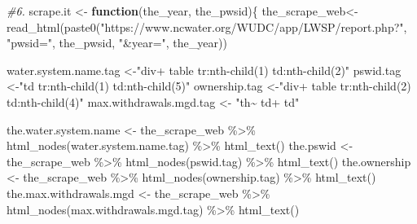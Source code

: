 \documentclass[
]{article}
\newenvironment{Shaded}{\begin{snugshade}}{\end{snugshade}}
\newcommand{\CommentTok}[1]{\textcolor[rgb]{0.56,0.35,0.01}{\textit{#1}}}
\newcommand{\ControlFlowTok}[1]{\textcolor[rgb]{0.13,0.29,0.53}{\textbf{#1}}}
\newcommand{\FunctionTok}[1]{\textcolor[rgb]{0.00,0.00,0.00}{#1}}
\newcommand{\NormalTok}[1]{#1}
\newcommand{\OtherTok}[1]{\textcolor[rgb]{0.56,0.35,0.01}{#1}}
\newcommand{\SpecialCharTok}[1]{\textcolor[rgb]{0.00,0.00,0.00}{#1}}
\newcommand{\StringTok}[1]{\textcolor[rgb]{0.31,0.60,0.02}{#1}}
\begin{document}
\begin{Shaded}
\begin{Highlighting}[]
\CommentTok{\#6.}
\NormalTok{scrape.it }\OtherTok{\textless{}{-}} \ControlFlowTok{function}\NormalTok{(the\_year, the\_pwsid)\{}
\NormalTok{  the\_scrape\_web}\OtherTok{\textless{}{-}}\FunctionTok{read\_html}\NormalTok{(}\FunctionTok{paste0}\NormalTok{(}\StringTok{"https://www.ncwater.org/WUDC/app/LWSP/report.php?"}\NormalTok{, }\StringTok{"pwsid="}\NormalTok{, the\_pwsid, }\StringTok{"\&year="}\NormalTok{, the\_year))}

\NormalTok{  water.system.name.tag }\OtherTok{\textless{}{-}}\StringTok{"div+ table tr:nth{-}child(1) td:nth{-}child(2)"}
\NormalTok{  pswid.tag }\OtherTok{\textless{}{-}}\StringTok{"td tr:nth{-}child(1) td:nth{-}child(5)"}
\NormalTok{  ownership.tag }\OtherTok{\textless{}{-}}\StringTok{"div+ table tr:nth{-}child(2) td:nth{-}child(4)"}
\NormalTok{  max.withdrawals.mgd.tag }\OtherTok{\textless{}{-}}  \StringTok{"th\textasciitilde{} td+ td"}

\NormalTok{  the.water.system.name }\OtherTok{\textless{}{-}}\NormalTok{ the\_scrape\_web }\SpecialCharTok{\%\textgreater{}\%} \FunctionTok{html\_nodes}\NormalTok{(water.system.name.tag) }\SpecialCharTok{\%\textgreater{}\%} \FunctionTok{html\_text}\NormalTok{()}
\NormalTok{  the.pswid }\OtherTok{\textless{}{-}}\NormalTok{ the\_scrape\_web }\SpecialCharTok{\%\textgreater{}\%}   \FunctionTok{html\_nodes}\NormalTok{(pswid.tag) }\SpecialCharTok{\%\textgreater{}\%}  \FunctionTok{html\_text}\NormalTok{()}
\NormalTok{  the.ownership }\OtherTok{\textless{}{-}}\NormalTok{ the\_scrape\_web }\SpecialCharTok{\%\textgreater{}\%} \FunctionTok{html\_nodes}\NormalTok{(ownership.tag) }\SpecialCharTok{\%\textgreater{}\%} \FunctionTok{html\_text}\NormalTok{()}
\NormalTok{  the.max.withdrawals.mgd }\OtherTok{\textless{}{-}}\NormalTok{ the\_scrape\_web }\SpecialCharTok{\%\textgreater{}\%} \FunctionTok{html\_nodes}\NormalTok{(max.withdrawals.mgd.tag) }\SpecialCharTok{\%\textgreater{}\%} \FunctionTok{html\_text}\NormalTok{()}


\end{Highlighting}
\end{Shaded}
\end{document}
